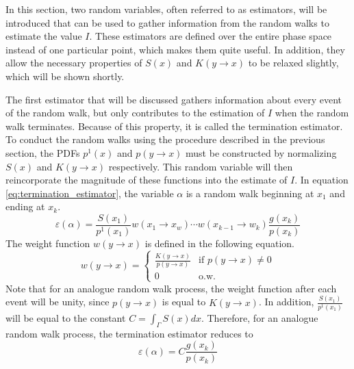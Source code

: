 In this section, two random variables, often referred to as estimators, will 
be introduced that can be used to gather information from the random walks to 
estimate the value $I$. These estimators are defined over the entire phase 
space instead of one particular point, which makes them quite useful. In 
addition, they allow the necessary properties of $S(x)$ and $K(y \to x)$ to be 
relaxed slightly, which will be shown shortly.

The first estimator that will be discussed gathers information about every
event of the random walk, but only contributes to the estimation of $I$ when
the random walk terminates. Because of this property, it is called the
termination estimator. To conduct the random walks using the procedure
described in the previous section, the PDFs $p^1(x)$ and $p(y \to x)$ must be 
constructed by normalizing $S(x)$ and $K(y \to x)$ respectively. This random
variable will then reincorporate the magnitude of these functions into
the estimate of $I$. In equation \ref{eq:termination_estimator}, the variable 
$\alpha$ is a random walk beginning at $x_1$ and ending at $x_k$.
\begin{equation}
  \varepsilon(\alpha) = \frac{S(x_1)}{p^1(x_1)}w(x_1 \to x_w)\cdots 
  w(x_{k-1} \to w_k)\frac{g(x_k)}{p(x_k)}
  \label{eq:termination_estimator}
\end{equation}
The weight function $w(y \to x)$ is defined in the following equation.
\begin{equation}
  w(y \to x) = 
  \begin{cases}
    \frac{K(y \to x)}{p(y \to x)} & \text{if } p(y \to x) \neq 0 \\
    0 & \text{o.w.}
  \end{cases}
\end{equation}
Note that for an analogue random walk process, the weight function after each
event will be unity, since $p(y \to x)$ is equal to $K(y \to x)$. In addition,
$\frac{S(x_1)}{p^1(x_1)}$ will be equal to the constant 
$C = \int_{\Gamma} S(x)dx$. Therefore, for an analogue random walk process, the
termination estimator reduces to
\begin{equation*}
  \varepsilon(\alpha) = C \frac{g(x_k)}{p(x_k)}
\end{equation*}

